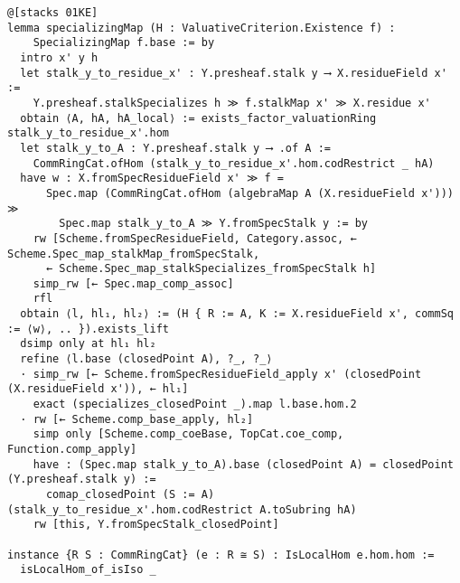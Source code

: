 \documentclass{article}
\begin{document}
\begin{lstlisting}[language=Lean, caption={ValuativeCriterion.lean}]
@[stacks 01KE]
lemma specializingMap (H : ValuativeCriterion.Existence f) :
    SpecializingMap f.base := by
  intro x' y h
  let stalk_y_to_residue_x' : Y.presheaf.stalk y ⟶ X.residueField x' :=
    Y.presheaf.stalkSpecializes h ≫ f.stalkMap x' ≫ X.residue x'
  obtain ⟨A, hA, hA_local⟩ := exists_factor_valuationRing stalk_y_to_residue_x'.hom
  let stalk_y_to_A : Y.presheaf.stalk y ⟶ .of A :=
    CommRingCat.ofHom (stalk_y_to_residue_x'.hom.codRestrict _ hA)
  have w : X.fromSpecResidueField x' ≫ f =
      Spec.map (CommRingCat.ofHom (algebraMap A (X.residueField x'))) ≫
        Spec.map stalk_y_to_A ≫ Y.fromSpecStalk y := by
    rw [Scheme.fromSpecResidueField, Category.assoc, ← Scheme.Spec_map_stalkMap_fromSpecStalk,
      ← Scheme.Spec_map_stalkSpecializes_fromSpecStalk h]
    simp_rw [← Spec.map_comp_assoc]
    rfl
  obtain ⟨l, hl₁, hl₂⟩ := (H { R := A, K := X.residueField x', commSq := ⟨w⟩, .. }).exists_lift
  dsimp only at hl₁ hl₂
  refine ⟨l.base (closedPoint A), ?_, ?_⟩
  · simp_rw [← Scheme.fromSpecResidueField_apply x' (closedPoint (X.residueField x')), ← hl₁]
    exact (specializes_closedPoint _).map l.base.hom.2
  · rw [← Scheme.comp_base_apply, hl₂]
    simp only [Scheme.comp_coeBase, TopCat.coe_comp, Function.comp_apply]
    have : (Spec.map stalk_y_to_A).base (closedPoint A) = closedPoint (Y.presheaf.stalk y) :=
      comap_closedPoint (S := A) (stalk_y_to_residue_x'.hom.codRestrict A.toSubring hA)
    rw [this, Y.fromSpecStalk_closedPoint]

instance {R S : CommRingCat} (e : R ≅ S) : IsLocalHom e.hom.hom :=
  isLocalHom_of_isIso _


\end{lstlisting}
\end{document}

